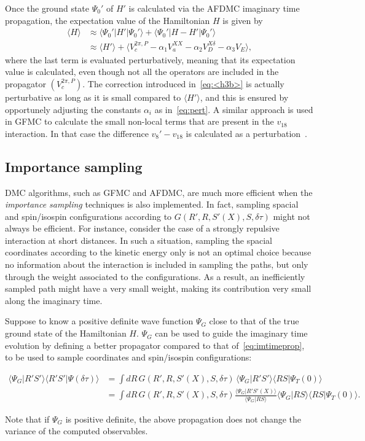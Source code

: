 \documentclass[aps,prc,twocolumn,superscriptaddress,showpacs,floatfix,nofootinbib]{revtex4-1}
\begin{document}
Once the ground state $\Psi_0'$ of $H'$ is calculated via the AFDMC imaginary
time propagation, the expectation value of the Hamiltonian $H$ is given by
\begin{align}
\!\!\langle H\rangle &\approx\langle\Psi_0'|H'|\Psi_0'\rangle+\langle\Psi_0'|H-H'|\Psi_0'\rangle \nonumber \\
& \approx\langle H'\rangle+\langle V_c^{2\pi,P}\!-\alpha_1V_a^{XX}\!-\alpha_2V_D^{X\delta}\!-\alpha_3V_E\rangle ,
\label{eq:<h3b>}
\end{align}
where the last term is evaluated perturbatively, meaning that its expectation
value is calculated, even though not all the operators are included in the propagator $(V_c^{2\pi,P})$.
The correction introduced in~\cref{eq:<h3b>} is actually perturbative as long as 
it is small compared to $\langle H'\rangle$, and this is ensured by opportunely adjusting 
the constants $\alpha_i$ as in~\cref{eq:pert}.
A similar approach is used in GFMC to calculate the small non-local terms that are 
present in the $v_{18}$ interaction. In that case the difference $v_8'-v_{18}$
is calculated as a perturbation~\cite{Pudliner:1997}.


\subsection{Importance sampling}
\label{sec:is}
DMC algorithms, such as GFMC and AFDMC, are much more efficient when the \emph{importance sampling}
techniques is also implemented.
In fact, sampling spacial and spin/isospin configurations according to $G(R',R,S'(X),S,\delta\tau)$ 
might not always be efficient. For instance, consider the case of a strongly repulsive interaction 
at short distances. In such a situation, sampling the spacial coordinates according to the kinetic 
energy only is not an optimal choice because no information about the interaction is included in 
sampling the paths, but only through the weight associated to the configurations. 
As a result, an inefficiently sampled path might have a very small weight, making its contribution 
very small along the imaginary time.

Suppose to know a positive definite wave function $\Psi_G$ close to that of the true ground state of
the Hamiltonian $H$. $\Psi_G$ can be used to guide the imaginary time evolution by defining a
better propagator compared to that of~\cref{eq:imtimeprop}, to be used to sample coordinates and 
spin/isospin configurations:
\begin{widetext}
\begin{align}
\langle\Psi_G|R'S'\rangle\langle R'S'|\Psi(\delta\tau)\rangle
&=\displaystyle\int dR\,G(R',R,S'(X),S,\delta\tau)\,\langle\Psi_G|R'S'\rangle\langle RS|\Psi_T(0)\rangle
\nonumber \\
&=\displaystyle\int dR\,G(R',R,S'(X),S,\delta\tau)\frac{\langle\Psi_G|R'S'(X)\rangle}{\langle\Psi_G|RS\rangle}
\langle\Psi_G|RS\rangle\langle RS|\Psi_T(0)\rangle .
\end{align}
\end{widetext}
Note that if $\Psi_G$ is positive definite, the above propagation does not change the 
variance of the computed observables.
\end{document}
